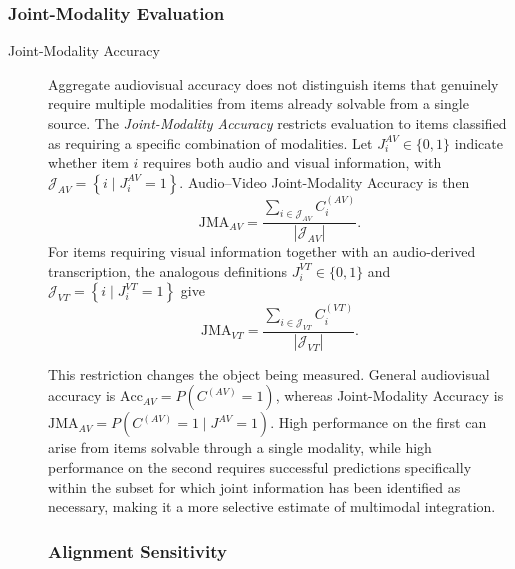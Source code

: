 \subsubsection*{Joint-Modality Evaluation}
\begin{description}
    \item[Joint-Modality Accuracy] Aggregate audiovisual accuracy does not distinguish items that genuinely require multiple modalities from items already solvable from a single source. The \textit{Joint-Modality Accuracy} restricts evaluation to items classified as requiring a specific combination of modalities.
Let \(J_i^{AV} \in \{0,1\}\) indicate whether item \(i\) requires both audio and visual information, with \(\mathcal{J}_{AV} = \left\{i \mid J_i^{AV}=1\right\}\). Audio--Video Joint-Modality Accuracy is then
\begin{equation}
\mathrm{JMA}_{AV}
=
\frac{
\sum_{i \in \mathcal{J}_{AV}}
C_i^{(AV)}
}{
\left|
\mathcal{J}_{AV}
\right|
}.
\end{equation}
For items requiring visual information together with an audio-derived transcription, the analogous definitions \(J_i^{VT} \in \{0,1\}\) and \(\mathcal{J}_{VT} = \left\{i \mid J_i^{VT}=1\right\}\) give
\begin{equation}
\mathrm{JMA}_{VT}
=
\frac{
\sum_{i \in \mathcal{J}_{VT}}
C_i^{(VT)}
}{
\left|
\mathcal{J}_{VT}
\right|
}.
\end{equation}

This restriction changes the object being measured. General audiovisual accuracy is \(\mathrm{Acc}_{AV} = P\left(C^{(AV)}=1\right)\), whereas Joint-Modality Accuracy is \(\mathrm{JMA}_{AV} = P\left(C^{(AV)}=1 \mid J^{AV}=1\right)\). High performance on the first can arise from items solvable through a single modality, while high performance on the second requires successful predictions specifically within the subset for which joint information has been identified as necessary, making it a more selective estimate of multimodal integration.

\subsubsection*{Alignment Sensitivity}


\end{description}
